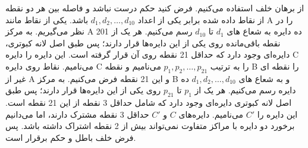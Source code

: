 \p	
از برهان خلف استفاده می‌کنیم. فرض کنید حکم درست نباشد و فاصله بین هر دو نقطه از نقاط داده شده برابر یکی از اعداد
$d_1, d_2, \ldots ,d_{10}$
باشد. یکی از نقاط مانند A را در نظر می‌گیریم.
به مرکز A ده دایره به شعاع های
$d_1$
تا
$d_{10}$
رسم می‌کنیم.
هر یک از 201 نقطه باقی‌مانده روی یکی از این دایره‌ها قرار دارند؛
پس طبق اصل لانه کبوتری، دایره‌ای وجود دارد که حداقل 21 نقطه روی آن قرار گرفته است.
این دایره را دایره C می‌نامیم.
نقاط روی دایره C را به ترتیب
$p_1, p_2, \ldots ,p_{21}$
می‌نامیم و نقطه B را نقطه ای غیر از A و این 21 نقطه فرض می‌کنیم.
به مرکز B و به شعاع های
$d_1, d_2, \ldots ,d_{10}$
ده دایره رسم می‌کنیم.
هر یک از 
$p_1$
تا
$p_{21}$
روی یکی از این دایره‌ها قرار دارند؛ پس طبق اصل لانه کبوتری دایره‌ای وجود دارد که شامل حداقل 3 نقطه از این 21 نقطه است. این دایره را 
$C'$
می‌نامیم.
دایره‌های 
$C$
و
$C'$
حداقل 3 نقطه مشترک دارند، اما می‌دانیم برخورد دو دایره با مراکز متفاوت نمی‌تواند بیش از 2 نقطه اشتراک داشته باشد. پس فرض خلف باطل و حکم برقرار است.
